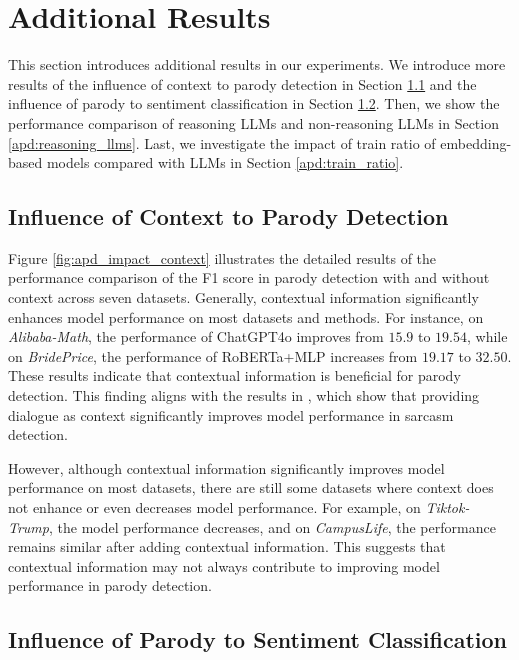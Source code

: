 \section{Additional Results}

This section introduces additional results in our experiments. We introduce more results of the influence of context to parody detection in Section \ref{apd:impact_context} and the influence of parody to sentiment classification in Section \ref{apd:impact_parody}. Then, we show the performance comparison of reasoning LLMs and non-reasoning LLMs in Section \ref{apd:reasoning_llms}. Last, we investigate the impact of train ratio of embedding-based models compared with LLMs in Section \ref{apd:train_ratio}.

\subsection{Influence of Context to Parody Detection}\label{apd:impact_context}


Figure \ref{fig:apd_impact_context} illustrates the detailed results of the performance comparison of the F1 score in parody detection with and without context across seven datasets. Generally, contextual information significantly enhances model performance on most datasets and methods. For instance, on \textit{Alibaba-Math}, the performance of ChatGPT4o improves from $15.9$ to $19.54$, while on \textit{BridePrice}, the performance of RoBERTa+MLP increases from $19.17$ to $32.50$. These results indicate that contextual information is beneficial for parody detection. This finding aligns with the results in \citet{dialogue_bamman, dialogue_wang}, which show that providing dialogue as context significantly improves model performance in sarcasm detection.

However, although contextual information significantly improves model performance on most datasets, there are still some datasets where context does not enhance or even decreases model performance. For example, on \textit{Tiktok-Trump}, the model performance decreases, and on \textit{CampusLife}, the performance remains similar after adding contextual information. This suggests that contextual information may not always contribute to improving model performance in parody detection.

\subsection{Influence of Parody to Sentiment Classification}\label{apd:impact_parody}


